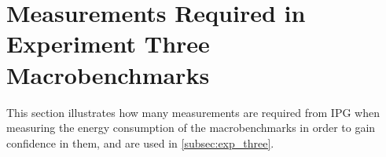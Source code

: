 \section{Measurements Required in Experiment Three Macrobenchmarks}\label{app:exp_three_coch}

This section illustrates how many measurements are required from IPG when measuring the energy consumption of the macrobenchmarks in order to gain confidence in them, and are used in \cref{subsec:exp_three}.


